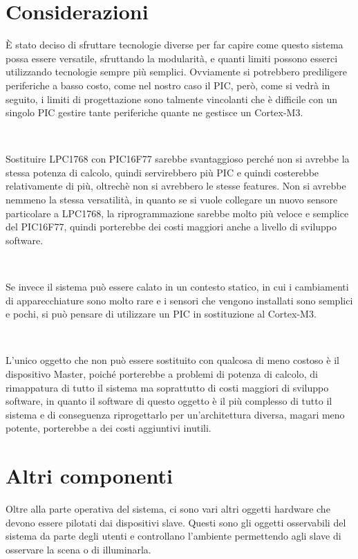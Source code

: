\documentclass[a4paper,titlepage]{book}
\begin{document}
\newpage
\section{Considerazioni}

È stato deciso di sfruttare tecnologie diverse per far capire come questo sistema possa essere versatile, sfruttando la modularità, e quanti limiti possono esserci utilizzando tecnologie sempre più semplici. Ovviamente si potrebbero prediligere periferiche a basso costo, come nel nostro caso il PIC, però, come si vedrà in seguito, i limiti di progettazione sono talmente vincolanti che è difficile con un singolo PIC gestire tante periferiche quante ne gestisce un Cortex-M3.

~

Sostituire LPC1768 con PIC16F77 sarebbe svantaggioso perché non si avrebbe la stessa potenza di calcolo, quindi servirebbero più PIC e quindi costerebbe relativamente di più, oltrechè non si avrebbero le stesse features. Non si avrebbe nemmeno la stessa versatilità, in quanto se si vuole collegare un nuovo sensore particolare a LPC1768, la riprogrammazione sarebbe molto più veloce e semplice del PIC16F77, quindi porterebbe dei costi maggiori anche a livello di sviluppo software.

~

Se invece il sistema può essere calato in un contesto statico, in cui i cambiamenti di apparecchiature sono molto rare e i sensori che vengono installati sono semplici e pochi, si può pensare di utilizzare un PIC in sostituzione al Cortex-M3.

~

L'unico oggetto che non può essere sostituito con qualcosa di meno costoso è il dispositivo Master, poiché porterebbe a problemi di potenza di calcolo, di rimappatura di tutto il sistema ma soprattutto di costi maggiori di sviluppo software, in quanto il software di questo oggetto è il più complesso di tutto il sistema e di conseguenza riprogettarlo per un'architettura diversa, magari meno potente, porterebbe a dei costi aggiuntivi inutili. 



\section{Altri componenti}

Oltre alla parte operativa del sistema, ci sono vari altri oggetti hardware che devono essere pilotati dai dispositivi slave. Questi sono gli oggetti osservabili del sistema da parte degli utenti e controllano l'ambiente permettendo agli slave di osservare la scena o di illuminarla.
\end{document}
